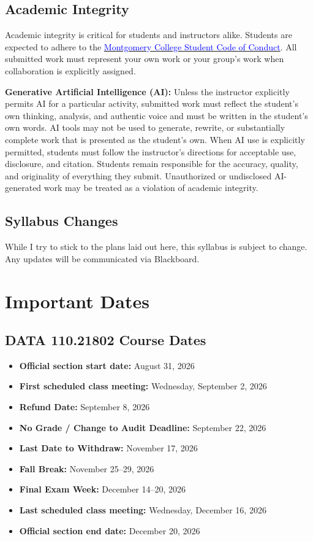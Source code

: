\documentclass{exam}
\begin{document}
\subsection*{Academic Integrity}
Academic integrity is critical for students and instructors alike. Students are expected to adhere to the \href{https://www.montgomerycollege.edu/_documents/policies-and-procedures/42001-student-code-of-conduct.pdf}{\textcolor{blue}{Montgomery College Student Code of Conduct}}. All submitted work must represent your own work or your group's work when collaboration is explicitly assigned.

\noindent \textbf{Generative Artificial Intelligence (AI):} Unless the instructor explicitly permits AI for a particular activity, submitted work must reflect the student's own thinking, analysis, and authentic voice and must be written in the student's own words. AI tools may not be used to generate, rewrite, or substantially complete work that is presented as the student's own. When AI use is explicitly permitted, students must follow the instructor's directions for acceptable use, disclosure, and citation. Students remain responsible for the accuracy, quality, and originality of everything they submit. Unauthorized or undisclosed AI-generated work may be treated as a violation of academic integrity.

\subsection*{Syllabus Changes}
While I try to stick to the plans laid out here, this syllabus is subject to change. Any updates will be communicated via Blackboard.

\section*{Important Dates}

\subsection*{DATA 110.21802 Course Dates}
\begin{itemize}
    \item \textbf{Official section start date:} August 31, 2026
    \item \textbf{First scheduled class meeting:} Wednesday, September 2, 2026
    \item \textbf{Refund Date:} September 8, 2026
    \item \textbf{No Grade / Change to Audit Deadline:} September 22, 2026
    \item \textbf{Last Date to Withdraw:} November 17, 2026
    \item \textbf{Fall Break:} November 25--29, 2026
    \item \textbf{Final Exam Week:} December 14--20, 2026
    \item \textbf{Last scheduled class meeting:} Wednesday, December 16, 2026
    \item \textbf{Official section end date:} December 20, 2026
\end{itemize}
\end{document}
